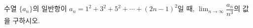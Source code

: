 수열 $\{a_n\}$의 일반항이 $a_n=1^2+3^2+5^2+\cdots+(2n-1)^2$일 때, $\displaystyle\lim_{n\to\infty}\dfrac{a_n}{n^3}$의 값을 구하시오.
